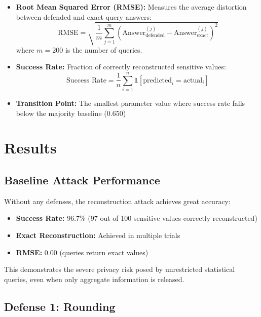 \documentclass[11pt,letterpaper]{article}
\begin{document}
\begin{itemize}[leftmargin=*]
    \item \textbf{Root Mean Squared Error (RMSE):} Measures the average distortion between defended and exact query answers:
    \begin{equation}
        \text{RMSE} = \sqrt{\frac{1}{m} \sum_{j=1}^{m} (\text{Answer}_{\text{defended}}^{(j)} - \text{Answer}_{\text{exact}}^{(j)})^2}
    \end{equation}
    where $m = 200$ is the number of queries.
    
    \item \textbf{Success Rate:} Fraction of correctly reconstructed sensitive values:
    \begin{equation}
        \text{Success Rate} = \frac{1}{n} \sum_{i=1}^{n} \mathbb{1}[\text{predicted}_i = \text{actual}_i]
    \end{equation}
    
    \item \textbf{Transition Point:} The smallest parameter value where success rate falls below the majority baseline (0.650)
\end{itemize}

\section{Results}

\subsection{Baseline Attack Performance}

Without any defenses, the reconstruction attack achieves great accuracy:

\begin{itemize}[leftmargin=*]
    \item \textbf{Success Rate:} 96.7\% (97 out of 100 sensitive values correctly reconstructed)
    \item \textbf{Exact Reconstruction:} Achieved in multiple trials
    \item \textbf{RMSE:} 0.00 (queries return exact values)
\end{itemize}

This demonstrates the severe privacy risk posed by unrestricted statistical queries, even when only aggregate information is released.

\subsection{Defense 1: Rounding}
\end{document}
